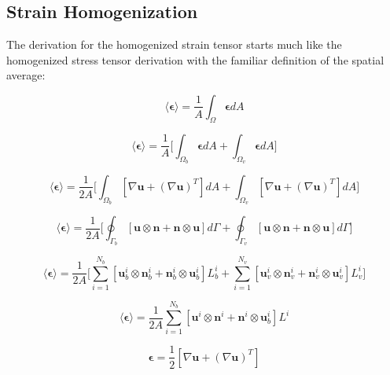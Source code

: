 \subsection{Strain Homogenization}
The derivation for the homogenized strain tensor starts much like the homogenized stress tensor derivation with the familiar definition of the spatial average:

\begin{equation}
\label{eqn:strain2}
\langle \boldsymbol{\epsilon} \rangle = 
\frac{1}{A} \int_\Omega \boldsymbol{\epsilon} {dA}
\end{equation}

\begin{equation}
\label{eqn:strain3}
\langle \boldsymbol{\epsilon} \rangle = 
\frac{1}{A} \bigg \lbrack {\int_{\Omega_{b}} \boldsymbol{\epsilon} { dA} + 
\int_{\Omega_{v}} \boldsymbol{\epsilon} {dA}} \bigg \rbrack
\end{equation}

\begin{equation}
\label{eqn:strain4}
\langle \boldsymbol{\epsilon} \rangle = 
\frac{1}{2 A} \bigg \lbrack {\int_{\Omega_{b}} \left[ \nabla \mathbf{u} + 
\left( \nabla \mathbf{u} \right)^{T} \right] {dA} +
\int_{\Omega_{v}} \left[ \nabla \mathbf{u} + 
\left( \nabla \mathbf{u} \right)^{T} \right] {dA}} \bigg \rbrack
\end{equation}

\begin{equation}
\label{eqn:strain5}
\langle \boldsymbol{\epsilon} \rangle = 
\frac{1}{2 A} \bigg \lbrack {\oint_{\Gamma_{b}} \left[ \mathbf{u} \otimes \mathbf{n} + 
\mathbf{n} \otimes \mathbf{u} \right] {d \Gamma} +
\oint_{\Gamma_{v}} \left[ \mathbf{u} \otimes \mathbf{n} + 
\mathbf{n} \otimes \mathbf{u} \right] { d \Gamma}} \bigg \rbrack
\end{equation}

\begin{equation}
\label{eqn:strain6}
\langle \boldsymbol{\epsilon} \rangle = 
\frac{1}{2 A} \bigg \lbrack {\sum_{i=1}^{N_{b}} \left[ \mathbf{u}_{b}^i \otimes \mathbf{n}_{b}^i + 
\mathbf{n}_{b}^i \otimes \mathbf{u}_{b}^i \right] {L_{b}^i} +
\sum_{i=1}^{N_{v}} \left[ \mathbf{u}_{v}^i \otimes \mathbf{n}_{v}^i + 
\mathbf{n}_{v}^i \otimes \mathbf{u}_{v}^i \right] {L_{v}^i}} \bigg \rbrack
\end{equation}

\begin{equation}
\label{eqn:strain7}
\langle \boldsymbol{\epsilon} \rangle = 
\frac{1}{2 A} \sum_{i=1}^{N_{b}} \left[ \mathbf{u}^i \otimes \mathbf{n}^i + 
\mathbf{n}^i \otimes \mathbf{u}_{b}^i \right] {L^i} 
\end{equation}






\begin{equation}
\label{eqn:strain1}
\boldsymbol{\epsilon} = 
\frac{1}{2}  \left[ \nabla \mathbf{u} + \left( \nabla \mathbf{u} \right)^{T} \right]
\end{equation}